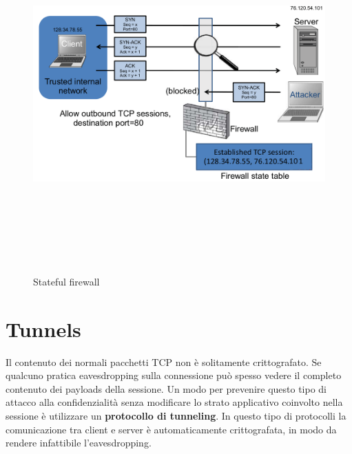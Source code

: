 \begin{figure}[htbp]
	\centering%
	\subfigure%
	{\includegraphics[height=13cm, width=13cm, keepaspectratio]{Immagini/firewalls/stateful_firewall.png}}
	\caption{Stateful firewall \label{fig:stateful_firewall}} 	
\end{figure}

\section{Tunnels}
Il contenuto dei normali pacchetti TCP non è solitamente crittografato. Se qualcuno pratica eavesdropping sulla connessione può spesso vedere il completo contenuto dei payloads della sessione. Un modo per prevenire questo tipo di attacco alla confidenzialità senza modificare lo strato applicativo coinvolto nella sessione è utilizzare un \textbf{protocollo di tunneling}. In questo tipo di protocolli la comunicazione tra client e server è automaticamente crittografata, in modo da rendere infattibile l'eavesdropping.

